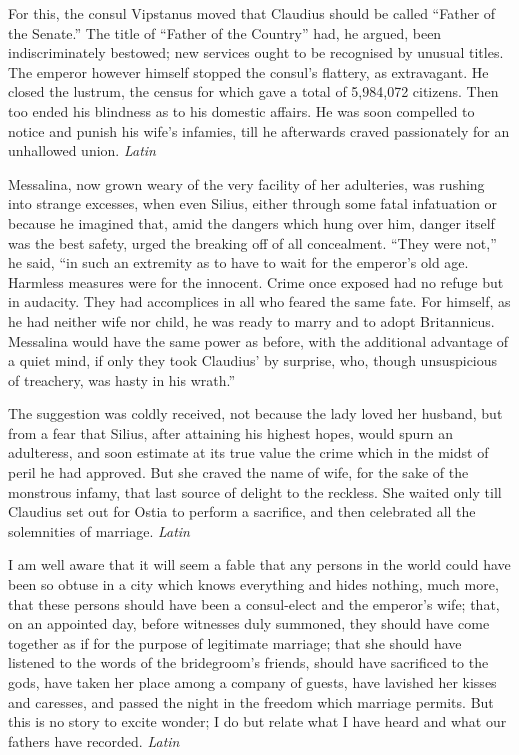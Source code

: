 For this, the consul Vipstanus moved that Claudius should be called ``Father of the Senate.'' The title of ``Father of the Country'' had, he argued, been indiscriminately bestowed; new services ought to be recognised by unusual titles. The emperor however himself stopped the consul's flattery, as extravagant. He closed the lustrum, the census for which gave a total of 5,984,072 citizens. Then too ended his blindness as to his domestic affairs. He was soon compelled to notice and punish his wife's infamies, till he afterwards craved passionately for an unhallowed union. \emph{Latin}


Messalina, now grown weary of the very facility of her adulteries, was rushing into strange excesses, when even Silius, either through some fatal infatuation or because he imagined that, amid the dangers which hung over him, danger itself was the best safety, urged the breaking off of all concealment. ``They were not,'' he said, ``in such an extremity as to have to wait for the emperor's old age. Harmless measures were for the innocent. Crime once exposed had no refuge but in audacity. They had accomplices in all who feared the same fate. For himself, as he had neither wife nor child, he was ready to marry and to adopt Britannicus. Messalina would have the same power as before, with the additional advantage of a quiet mind, if only they took Claudius' by surprise, who, though unsuspicious of treachery, was hasty in his wrath.''

The suggestion was coldly received, not because the lady loved her husband, but from a fear that Silius, after attaining his highest hopes, would spurn an adulteress, and soon estimate at its true value the crime which in the midst of peril he had approved. But she craved the name of wife, for the sake of the monstrous infamy, that last source of delight to the reckless. She waited only till Claudius set out for Ostia to perform a sacrifice, and then celebrated all the solemnities of marriage. \emph{Latin}


I am well aware that it will seem a fable that any persons in the world could have been so obtuse in a city which knows everything and hides nothing, much more, that these persons should have been a consul-elect and the emperor's wife; that, on an appointed day, before witnesses duly summoned, they should have come together as if for the purpose of legitimate marriage; that she should have listened to the words of the bridegroom's friends, should have sacrificed to the gods, have taken her place among a company of guests, have lavished her kisses and caresses, and passed the night in the freedom which marriage permits. But this is no story to excite wonder; I do but relate what I have heard and what our fathers have recorded. \emph{Latin}

